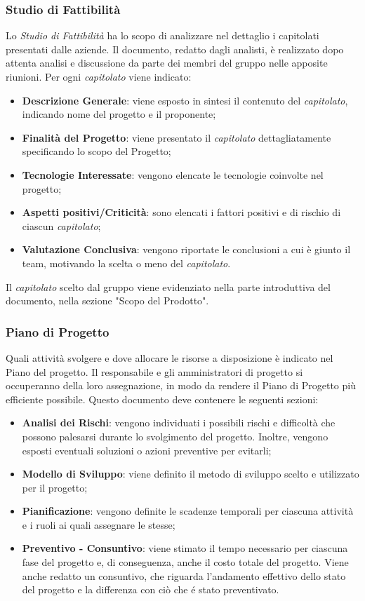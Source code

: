 \subsubsection{Studio di Fattibilità}
Lo \textit{Studio di Fattibilità\doc} ha lo scopo di analizzare nel dettaglio i capitolati presentati dalle aziende. Il documento,  redatto dagli analisti, è realizzato dopo attenta analisi e discussione da parte dei membri del gruppo nelle apposite riunioni. Per ogni \textit{capitolato\glo} viene indicato:
\begin{itemize}
  \item \textbf{Descrizione Generale}: viene esposto in sintesi il contenuto del \textit{capitolato\glos}, indicando nome del progetto e il proponente;
  \item \textbf{Finalità del Progetto}: viene presentato il \textit{capitolato\glo} dettagliatamente specificando lo scopo del Progetto;
  \item \textbf{Tecnologie Interessate}: vengono elencate le tecnologie coinvolte nel progetto;
  \item \textbf{Aspetti positivi/Criticità}: sono elencati i fattori positivi e di rischio di ciascun \textit{capitolato\glos};
  \item \textbf{Valutazione Conclusiva}: vengono riportate le conclusioni a cui è giunto il team, motivando la scelta o meno del \textit{capitolato\glos}.
\end{itemize}
Il \textit{capitolato\glo} scelto dal gruppo viene evidenziato nella parte introduttiva del documento, nella sezione "Scopo del Prodotto".
\subsubsection{Piano di Progetto}
Quali attività svolgere e dove allocare le risorse a disposizione è indicato nel Piano del progetto. Il responsabile e gli amministratori di progetto si occuperanno della loro assegnazione, in modo da rendere il Piano di Progetto più efficiente possibile. Questo documento deve contenere le seguenti sezioni:
\begin{itemize}
  \item \textbf{Analisi dei Rischi}: vengono individuati i possibili rischi e difficoltà che possono palesarsi durante lo svolgimento del progetto. Inoltre, vengono esposti eventuali soluzioni o azioni preventive per evitarli;
  \item \textbf{Modello di Sviluppo}: viene definito il metodo di sviluppo scelto e utilizzato per il progetto;
  \item \textbf{Pianificazione}: vengono definite le scadenze temporali per ciascuna attività e i ruoli ai quali assegnare le stesse;
  \item \textbf{Preventivo - Consuntivo}: viene stimato il tempo necessario per ciascuna fase del progetto e, di conseguenza, anche il costo totale del progetto. Viene anche redatto un consuntivo, che riguarda l'andamento effettivo dello stato del progetto e la differenza con ciò che é stato preventivato.
\end{itemize}
